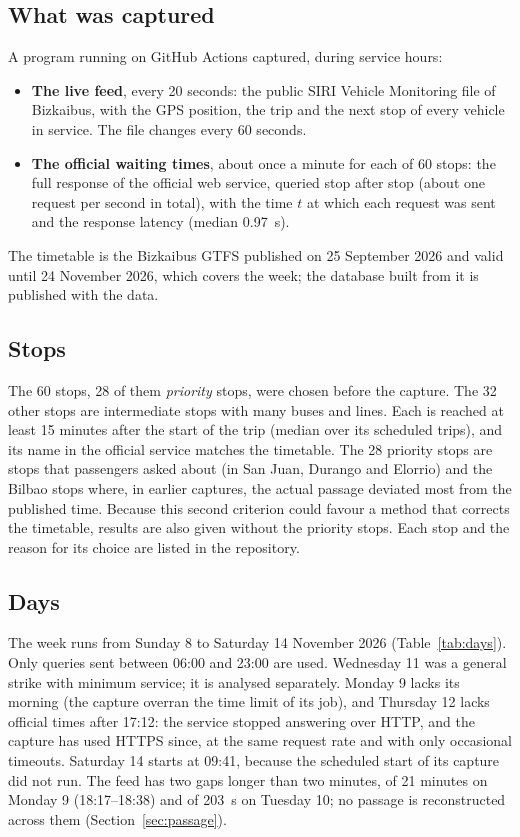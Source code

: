 \subsection{What was captured}

A program running on GitHub Actions captured, during service hours:
\begin{itemize}
  \item \textbf{The live feed}, every 20 seconds: the public SIRI Vehicle Monitoring file of Bizkaibus, with the GPS
        position, the trip and the next stop of every vehicle in service. The file changes every 60 seconds.
  \item \textbf{The official waiting times}, about once a minute for each of 60 stops: the full response of the official
        web service, queried stop after stop (about one request per second in total), with the time $t$ at which each
        request was sent and the response latency (median 0.97~s).
\end{itemize}
The timetable is the Bizkaibus GTFS published on 25 September 2026 and valid until 24 November 2026, which covers the week;
the database built from it is published with the data.

\subsection{Stops}

The 60 stops, 28 of them \emph{priority} stops, were chosen before the capture. The 32 other stops are intermediate stops with many buses and lines. Each is reached at least 15 minutes after the
start of the trip (median over its scheduled trips), and its name in the official service matches the timetable. The 28 priority stops are stops that passengers asked about (in San Juan, Durango
and Elorrio) and the Bilbao stops where, in earlier captures, the actual passage deviated most from the published time.
Because this second criterion could favour a method that corrects the timetable, results are also given without the
priority stops. Each stop and the reason for its choice are listed in the repository.

\subsection{Days}

The week runs from Sunday 8 to Saturday 14 November 2026 (Table~\ref{tab:days}). Only queries sent between 06:00 and 23:00
are used. Wednesday 11 was a general strike with minimum service; it is analysed separately. Monday 9 lacks its morning (the
capture overran the time limit of its job), and Thursday 12 lacks official times after 17:12: the service stopped answering
over HTTP, and the capture has used HTTPS since, at the same request rate and with only occasional timeouts. Saturday 14 starts at 09:41,
because the scheduled start of its capture did not run. The feed has two gaps longer than two minutes, of 21 minutes on
Monday 9 (18:17--18:38) and of 203~s on Tuesday 10; no passage is reconstructed across them (Section~\ref{sec:passage}).

